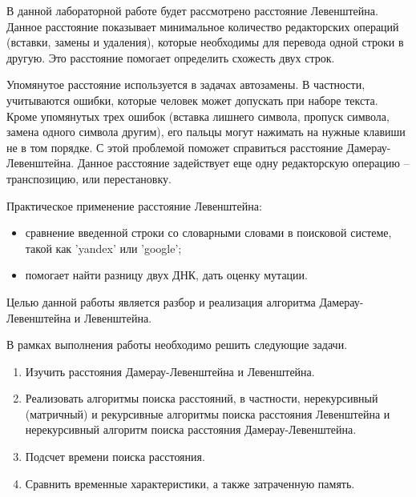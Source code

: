\Introduction
В данной лабораторной работе будет рассмотрено расстояние Левенштейна. Данное расстояние показывает минимальное количество редакторских операций (вставки, замены и удаления), которые необходимы для перевода одной строки в другую. Это расстояние помогает определить схожесть двух строк.

Упомянутое расстояние используется в задачах автозамены. В частности, учитываются ошибки, которые человек может допускать при наборе текста. Кроме упомянутых трех ошибок (вставка лишнего символа, пропуск символа, замена одного символа другим), его пальцы могут нажимать на нужные клавиши не в том порядке. С этой проблемой поможет справиться расстояние Дамерау-Левенштейна. Данное расстояние задействует еще одну редакторскую операцию -- транспозицию, или перестановку.

Практическое применение расстояние Левенштейна:

\begin{itemize}
	\item сравнение введенной строки со словарными словами в поисковой системе, такой как 'yandex' или 'google';
	\item помогает найти разницу двух ДНК, дать оценку мутации.
\end{itemize}

Целью данной работы является разбор и реализация алгоритма Дамерау-Левенштейна и Левенштейна.

В рамках выполнения работы необходимо решить следующие задачи.

\begin{enumerate}
	\item Изучить расстояния Дамерау-Левенштейна и Левенштейна.
	\item Реализовать алгоритмы поиска расстояний, в частности, нерекурсивный (матричный) и рекурсивные алгоритмы поиска расстояния Левенштейна и нерекурсивный алгоритм поиска расстояния Дамерау-Левенштейна.
	\item Подсчет времени поиска расстояния.
	\item Сравнить временные характеристики, а также затраченную память.
\end{enumerate}